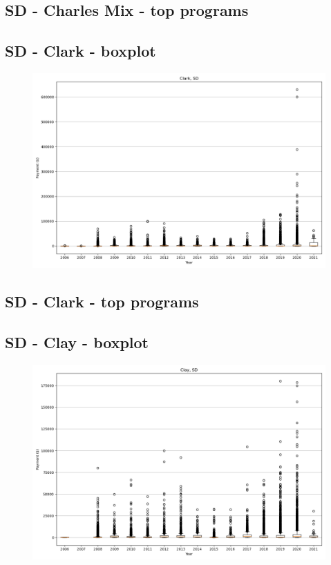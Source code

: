 \subsection*{SD - Charles Mix - top programs}

\newpage
\subsection*{SD - Clark - boxplot}
\begin{figure}[h]
\centering
\includegraphics[width=7in]{../output/boxplots/counties/Clark-SD_boxplot.png}
\end{figure}


\subsection*{SD - Clark - top programs}

\newpage
\subsection*{SD - Clay - boxplot}
\begin{figure}[h]
\centering
\includegraphics[width=7in]{../output/boxplots/counties/Clay-SD_boxplot.png}
\end{figure}


